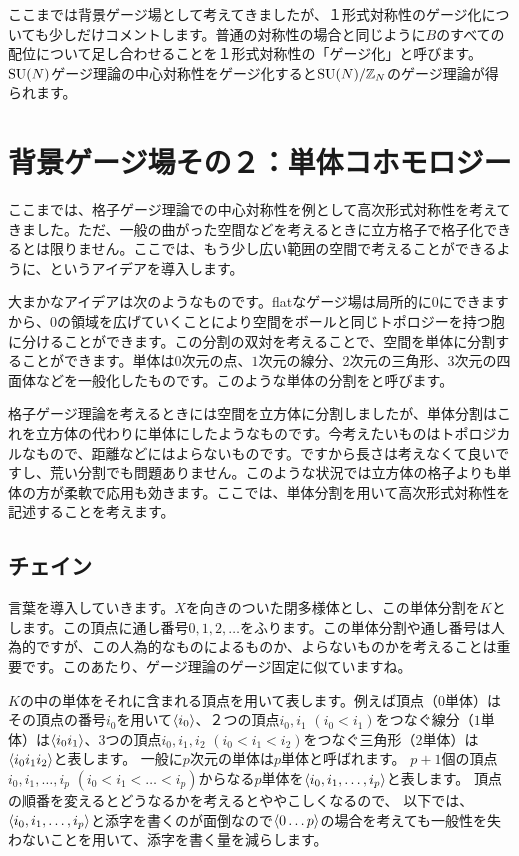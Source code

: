 \documentclass[generalized_symmetry.tex]{subfiles}
\begin{document}
ここまでは背景ゲージ場として考えてきましたが、１形式対称性のゲージ化についても少しだけコメントします。普通の対称性の場合と同じように$B$のすべての配位について足し合わせることを１形式対称性の「ゲージ化」と呼びます。$\mbox{SU}(N)$ゲージ理論の中心対称性をゲージ化すると$\mbox{SU}(N)/\mathbb{Z}_N$のゲージ理論が得られます。

\section{背景ゲージ場その２：単体コホモロジー}
ここまでは、格子ゲージ理論での中心対称性を例として高次形式対称性を考えてきました。ただ、一般の曲がった空間などを考えるときに立方格子で格子化できるとは限りません。ここでは、もう少し広い範囲の空間で考えることができるように、というアイデアを導入します。

大まかなアイデアは次のようなものです。flatなゲージ場は局所的に$0$にできますから、$0$の領域を広げていくことにより空間をボールと同じトポロジーを持つ胞に分けることができます。この分割の双対を考えることで、空間を単体に分割することができます。単体は$0$次元の点、$1$次元の線分、$2$次元の三角形、$3$次元の四面体などを一般化したものです。このような単体の分割をと呼びます。

格子ゲージ理論を考えるときには空間を立方体に分割しましたが、単体分割はこれを立方体の代わりに単体にしたようなものです。今考えたいものはトポロジカルなもので、距離などにはよらないものです。ですから長さは考えなくて良いですし、荒い分割でも問題ありません。このような状況では立方体の格子よりも単体の方が柔軟で応用も効きます。ここでは、単体分割を用いて高次形式対称性を記述することを考えます。

\subsection{チェイン}
言葉を導入していきます。$X$を向きのついた閉多様体とし、この単体分割を$K$とします。この頂点に通し番号$0,1,2,\dots$をふります。この単体分割や通し番号は人為的ですが、この人為的なものによるものか、よらないものかを考えることは重要です。このあたり、ゲージ理論のゲージ固定に似ていますね。

$K$の中の単体をそれに含まれる頂点を用いて表します。例えば頂点（$0$単体）はその頂点の番号$i_0$を用いて$\expval{i_0}$、２つの頂点$i_0,i_1$ $(i_0<i_1)$をつなぐ線分（$1$単体）は$\expval{i_0 i_1}$、$3$つの頂点$i_0,i_1,i_2$ $(i_0<i_1<i_2)$をつなぐ三角形（$2$単体）は$\expval{i_0 i_1 i_2}$と表します。
一般に$p$次元の単体は$p$単体と呼ばれます。
$p+1$個の頂点$i_0,  i_1,\dots,i_p$ $(i_0<i_1<\dots<i_p)$からなる$p$単体を$\expval{i_0,i_1,\dots,i_p}$と表します。
頂点の順番を変えるとどうなるかを考えるとややこしくなるので、
以下では、$\expval{i_0,i_1,\dots,i_p}$と添字を書くのが面倒なので$\expval{0\dots p}$の場合を考えても一般性を失わないことを用いて、添字を書く量を減らします。
\end{document}
